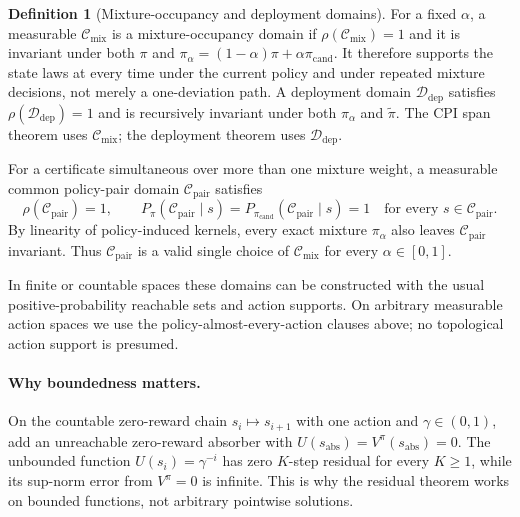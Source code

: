 \documentclass{article}
\theoremstyle{plain}
\theoremstyle{definition}
\newtheorem{definition}[theorem]{Definition}
\theoremstyle{remark}
\begin{document}
\begin{definition}[Mixture-occupancy and deployment domains]
\label{def:mixture_deployment_domains}
For a fixed $\alpha$, a measurable $\mathcal C_{\mathrm{mix}}$ is a
mixture-occupancy domain if $\rho(\mathcal C_{\mathrm{mix}})=1$ and it is
invariant under both $\pi$ and
$\pi_\alpha=(1-\alpha)\pi+\alpha\pi_{\mathrm{cand}}$. It therefore supports
the state laws at every time under the current policy and under repeated
mixture decisions, not merely a one-deviation path. A deployment domain
$\mathcal D_{\mathrm{dep}}$ satisfies
$\rho(\mathcal D_{\mathrm{dep}})=1$ and is recursively invariant under both
$\pi_\alpha$ and $\widetilde\pi$. The CPI span theorem uses
$\mathcal C_{\mathrm{mix}}$; the deployment theorem uses
$\mathcal D_{\mathrm{dep}}$.

For a certificate simultaneous over more than one mixture weight, a
measurable common policy-pair domain $\mathcal C_{\mathrm{pair}}$ satisfies
\begin{equation}
\rho(\mathcal C_{\mathrm{pair}})=1,
\qquad
P_\pi(\mathcal C_{\mathrm{pair}}\mid s)
=P_{\pi_{\mathrm{cand}}}(\mathcal C_{\mathrm{pair}}\mid s)=1
\quad\text{for every }s\in\mathcal C_{\mathrm{pair}}.
\label{eq:pair_domain_invariance}
\end{equation}
By linearity of policy-induced kernels, every exact mixture $\pi_\alpha$
also leaves $\mathcal C_{\mathrm{pair}}$ invariant. Thus
$\mathcal C_{\mathrm{pair}}$ is a valid single choice of
$\mathcal C_{\mathrm{mix}}$ for every $\alpha\in[0,1]$.
\end{definition}

In finite or countable spaces these domains can be constructed with the usual
positive-probability reachable sets and action supports. On arbitrary
measurable action spaces we use the policy-almost-every-action clauses above;
no topological action support is presumed.

\paragraph{Why boundedness matters.}
On the countable zero-reward chain $s_i\mapsto s_{i+1}$ with one action and
$\gamma\in(0,1)$, add an unreachable zero-reward absorber with
$U(s_{\mathrm{abs}})=V^\pi(s_{\mathrm{abs}})=0$. The unbounded function
$U(s_i)=\gamma^{-i}$ has zero $K$-step residual for every $K\ge1$, while
its sup-norm error from $V^\pi=0$ is infinite. This is why the residual
theorem works on bounded functions, not arbitrary pointwise solutions.
\end{document}
